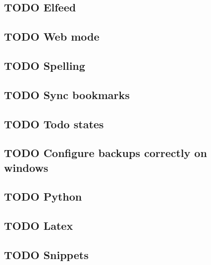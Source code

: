 \documentclass[11pt]{article}
\begin{document}
\subsection{{\bfseries\sffamily TODO} Elfeed}
\label{sec:org0b2072e}
\subsection{{\bfseries\sffamily TODO} Web mode}
\label{sec:orgbe3d6b9}
\subsection{{\bfseries\sffamily TODO} Spelling}
\label{sec:org103674c}
\subsection{{\bfseries\sffamily TODO} Sync bookmarks}
\label{sec:org1a71222}
\subsection{{\bfseries\sffamily TODO} Todo states}
\label{sec:org89254de}
\subsection{{\bfseries\sffamily TODO} Configure backups correctly on windows}
\label{sec:org8fb09c1}
\subsection{{\bfseries\sffamily TODO} Python}
\label{sec:org4b72521}
\subsection{{\bfseries\sffamily TODO} Latex}
\label{sec:orge3c262a}
\subsection{{\bfseries\sffamily TODO} Snippets}
\label{sec:orge4ba0df}
\end{document}
